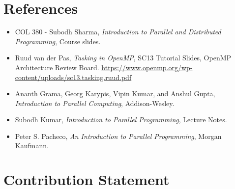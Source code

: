 \section {References}
\begin{itemize}
    \item COL 380 - Subodh Sharma, \textit{Introduction to Parallel and Distributed Programming}, Course slides.
    \item Ruud van der Pas, \textit{Tasking in OpenMP}, SC13 Tutorial Slides, OpenMP Architecture Review Board. \url{https://www.openmp.org/wp-content/uploads/sc13.tasking.ruud.pdf}
    \item Ananth Grama, Georg Karypis, Vipin Kumar, and Anshul Gupta, \textit{Introduction to Parallel Computing}, Addison-Wesley.
    \item Subodh Kumar, \textit{Introduction to Parallel Programming}, Lecture Notes.
    \item Peter S. Pacheco, \textit{An Introduction to Parallel Programming}, Morgan Kaufmann.
\end{itemize}

\section{Contribution Statement}


